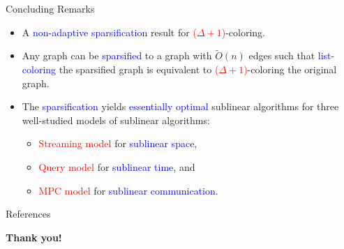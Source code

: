 \documentclass[aspectratio=169,xcolor=dvipsnames]{beamer}
\begin{document}
	\begin{frame}{Concluding Remarks}
		
		\begin{itemize}
			\item A \textcolor{blue}{non-adaptive sparsification} result for \textcolor{red}{(\(\Delta+1\))}-coloring.
			
			\vspace{0.5em}
			\item Any graph can be \textcolor{blue}{sparsified} to a graph with \(\tilde{O}(n)\) edges such that \textcolor{blue}{list-coloring} the sparsified graph is equivalent to \textcolor{red}{(\(\Delta+1\))}-coloring the original graph.
			
			\vspace{0.5em}
			\item The \textcolor{blue}{sparsification} yields \textcolor{blue}{essentially optimal} sublinear algorithms for three well-studied models of sublinear algorithms:
			\begin{itemize}
				\item \textcolor{red}{Streaming model} for \textcolor{blue}{sublinear space},
				\item \textcolor{red}{Query model} for \textcolor{blue}{sublinear time}, and
				\item \textcolor{red}{MPC model} for \textcolor{blue}{sublinear communication}.
			\end{itemize}
		\end{itemize}
		
	\end{frame}
	
	\begin{frame}{References}
		\footnotesize
		
		
	\end{frame}
	
	\begin{frame}
		\Huge{\centerline{\textbf{Thank you!}}}
	\end{frame}
	
\end{document}
